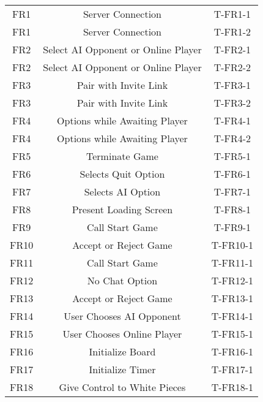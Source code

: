 \documentclass[12pt, titlepage]{article}
\begin{document}
\begin{center}
\begin{longtable}{ |c|c|c| }
        \hline
        FR1     & Server Connection                     & T-FR1-1 \\ 
        FR1     & Server Connection                     & T-FR1-2 \\ 
        \hline
        FR2     & Select AI Opponent or Online Player   & T-FR2-1 \\ 
        FR2     & Select AI Opponent or Online Player   & T-FR2-2 \\ 
        \hline
        FR3     & Pair with Invite Link                 & T-FR3-1 \\ 
        FR3     & Pair with Invite Link                 & T-FR3-2 \\ 
        \hline
        FR4     & Options while Awaiting Player         & T-FR4-1 \\ 
        FR4     & Options while Awaiting Player         & T-FR4-2 \\ 
        \hline
        FR5     & Terminate Game                        & T-FR5-1 \\ 
        \hline
        FR6     & Selects Quit Option                   & T-FR6-1 \\ 
        \hline
        FR7     & Selects AI Option                     & T-FR7-1 \\ 
        \hline
        FR8     & Present Loading Screen                & T-FR8-1 \\ 
        \hline
        FR9     & Call Start Game                       & T-FR9-1 \\ 
        \hline
        FR10    & Accept or Reject Game                 & T-FR10-1 \\ 
        \hline
        FR11    & Call Start Game                       & T-FR11-1 \\ 
        \hline
        FR12    & No Chat Option                        & T-FR12-1 \\ 
        \hline
        FR13    & Accept or Reject Game                 & T-FR13-1 \\ 
        \hline
        FR14    & User Chooses AI Opponent              & T-FR14-1 \\ 
        \hline
        FR15    & User Chooses Online Player            & T-FR15-1 \\ 
        \hline
        FR16    & Initialize Board                      & T-FR16-1 \\ 
        \hline
        FR17    & Initialize Timer                      & T-FR17-1 \\ 
        \hline
        FR18    & Give Control to White Pieces          & T-FR18-1 \\ 

\end{longtable}
\end{center}
\end{document}

